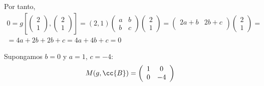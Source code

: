 \begin{ejercicio}
\begin{enumerate}
        Por tanto,
        \begin{multline*}
            0 = g\left[\left(
            \begin{array}{c}
                2 \\ 1
            \end{array}\right),
            \left(
            \begin{array}{c}
                2 \\ 1
            \end{array}\right)\right] =
            (2,1)
            \left( \begin{array}{cc}
                a & b \\
                b & c
            \end{array} \right)
            \left(
            \begin{array}{c}
                2 \\ 1
            \end{array}\right) =
            \left( \begin{array}{cc}
                2a+b & 2b+c \\
            \end{array} \right)
            \left(
            \begin{array}{c}
                2 \\ 1
            \end{array}\right)
            =\\= 4a+2b + 2b + c = 4a + 4b + c= 0
        \end{multline*}

        Supongamos $b=0$ y $a=1$, $c=-4$:
        \begin{equation*}
            M(g, \cc{B}) = \left( \begin{array}{cc}
                1 & 0 \\
                0 & -4
            \end{array} \right)
        \end{equation*}


\end{enumerate}
\end{ejercicio}
